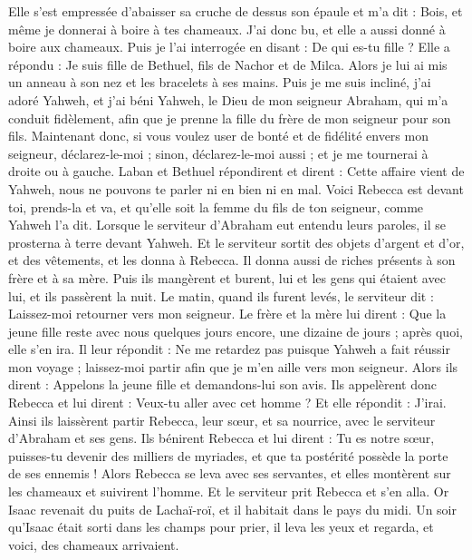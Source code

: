 \begin{multicols}{2}
Elle s’est empressée d’abaisser sa cruche de dessus son épaule et m'a dit : Bois, et même je donnerai à boire à tes chameaux. J'ai donc bu, et elle a aussi donné à boire aux chameaux.
Puis je l'ai interrogée en disant : De qui es-tu fille ? Elle a répondu : Je suis fille de Bethuel, fils de Nachor et de Milca. Alors je lui ai mis un anneau à son nez et les bracelets à ses mains.
Puis je me suis incliné, j’ai adoré Yahweh, et j'ai béni Yahweh, le Dieu de mon seigneur Abraham, qui m'a conduit fidèlement, afin que je prenne la fille du frère de mon seigneur pour son fils.
Maintenant donc, si vous voulez user de bonté et de fidélité envers mon seigneur, déclarez-le-moi ; sinon, déclarez-le-moi aussi ; et je me tournerai à droite ou à gauche.
Laban et Bethuel répondirent et dirent : Cette affaire vient de Yahweh, nous ne pouvons te parler ni en bien ni en mal.
Voici Rebecca est devant toi, prends-la et va, et qu'elle soit la femme du fils de ton seigneur, comme Yahweh l’a dit.
Lorsque le serviteur d'Abraham eut entendu leurs paroles, il se prosterna à terre devant Yahweh.
Et le serviteur sortit des objets d'argent et d'or, et des vêtements, et les donna à Rebecca. Il donna aussi de riches présents à son frère et à sa mère.
Puis ils mangèrent et burent, lui et les gens qui étaient avec lui, et ils passèrent la nuit.  Le matin,  quand ils furent levés, le serviteur dit : Laissez-moi retourner vers mon seigneur.
Le frère et la mère lui dirent : Que la jeune fille reste avec nous quelques jours encore, une dizaine de jours ;  après quoi, elle s'en ira.
Il leur répondit : Ne me retardez pas puisque Yahweh a fait réussir mon voyage ; laissez-moi partir  afin que je m'en aille vers mon seigneur.
Alors ils dirent : Appelons la jeune fille et demandons-lui son avis.
Ils appelèrent donc Rebecca et lui dirent : Veux-tu aller avec cet homme ? Et elle répondit : J'irai.
Ainsi ils laissèrent partir Rebecca, leur sœur, et sa nourrice, avec le serviteur d'Abraham et ses gens.
Ils bénirent Rebecca et lui dirent : Tu es notre sœur, puisses-tu devenir des milliers de myriades, et que ta postérité possède la porte de ses ennemis !
Alors Rebecca se leva avec ses servantes, et elles montèrent sur les chameaux et suivirent l’homme. Et le serviteur prit Rebecca et s'en alla.
Or Isaac revenait du puits de Lachaï-roï, et il habitait dans le pays du midi.
Un soir qu’Isaac était sorti dans les champs pour prier, il leva les yeux et regarda, et voici, des chameaux arrivaient.

\end{multicols}
